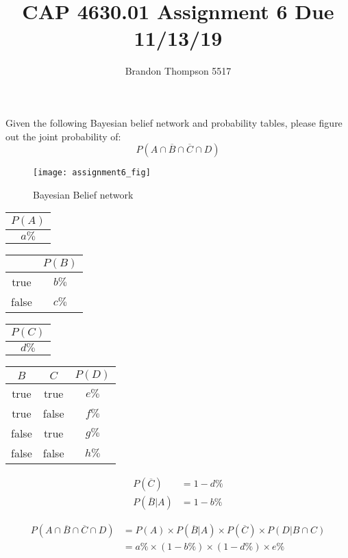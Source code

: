 \documentclass[a4paper]{article}
\begin{document}
	\title{CAP 4630.01 Assignment 6 Due 11/13/19}
	\author{Brandon Thompson 5517}
	\maketitle

	Given the following Bayesian belief network and probability tables, please figure
	out the joint probability of:
	\begin{equation*}
		P\left( A \cap \overline{B} \cap \overline{C} \cap D \right) 
	\end{equation*}
	\begin{figure}[ht!]
		\centering
		\texttt{[image: assignment6\_fig]}
		\caption{Bayesian Belief network}
		\label{fig:1}
	\end{figure}

	\begin{center}
		\begin{tabular}{| c |}
			\hline
			$P\left( A \right) $ \\
			\hline
			$a\%$ \\
			\hline
		\end{tabular}
	\end{center}

	\begin{center}
		\begin{tabular}{| c | c |}
			\hline
			{$A$ & $P\left( B \right) $ \\
			\hline
			true & $b\%$ \\
			\hline
			false & $c\%$ \\
			\hline
		\end{tabular}
	\end{center}

	\begin{center}
		\begin{tabular}{| c |}
			\hline
			$P\left( C \right) $\\
			\hline
			$d\%$ \\
			\hline
		\end{tabular}
	\end{center}

	\begin{center}
		\begin{tabular}{| c | c | c |}
			\hline
			$B$ & $C$ & $P\left( D \right) $ \\
			\hline
			true & true & $e\%$ \\
			\hline
			true & false & $f\%$ \\
			\hline
			false & true & $g\%$ \\
			\hline
			false & false & $h\%$ \\
			\hline
		\end{tabular}
	\end{center}
\clearpage
	\begin{align*}
		P(\overline{C}) &= 1-d\%\\
		P(\overline{B}|A) &= 1-b\%
	\end{align*}

\begin{equation*}	
	\begin{split}
		P(A \cap \overline{B} \cap \overline{C} \cap D )& = P(A) \times P(\overline{B}| A) \times P(\overline{C}) \times P(D|B \cap C)\\
		& = a\% \times (1-b\%) \times (1-d\%) \times e\%
	\end{split}
\end{equation*}
\end{document}

